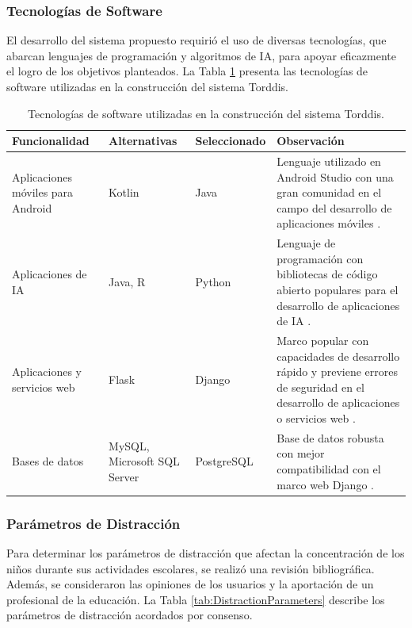 \subsubsection*{Tecnologías de Software}
El desarrollo del sistema propuesto requirió el uso de diversas tecnologías, que abarcan lenguajes de programación y algoritmos de IA, para apoyar eficazmente el logro de los objetivos planteados. La Tabla \ref{table:software-technologies} presenta las tecnologías de software utilizadas en la construcción del sistema Torddis.

\begin{table}[hbt]
\caption{Tecnologías de software utilizadas en la construcción del sistema Torddis.}
\label{table:software-technologies}
\centering
\begin{tabular}{p{}p{}p{}p{}}
	\hline
	\multicolumn{1}{l}{\textbf{Funcionalidad}} & \multicolumn{1}{l}{\textbf{Alternativas }} & \multicolumn{1}{l}{\textbf{Seleccionado}} & \multicolumn{1}{l}{\textbf{Observación}} \\ \hline
	Aplicaciones móviles para Android & Kotlin & Java & Lenguaje utilizado en Android Studio con una gran comunidad en el campo del desarrollo de aplicaciones móviles \citep{Sharma2021Real-Time}. \\
	Aplicaciones de IA & Java, R & Python & Lenguaje de programación con bibliotecas de código abierto populares para el desarrollo de aplicaciones de IA \citep{Cai2005OnThePerformance}. \\
	Aplicaciones y servicios web & Flask & Django & Marco popular con capacidades de desarrollo rápido y previene errores de seguridad en el desarrollo de aplicaciones o servicios web \citep{Puneet2022ADjango}. \\
	Bases de datos & MySQL, Microsoft SQL Server & PostgreSQL & Base de datos robusta con mejor compatibilidad con el marco web Django \citep{Puneet2022ADjango}. \\ \hline
\end{tabular}
\end{table}

\subsubsection*{Parámetros de Distracción}
Para determinar los parámetros de distracción que afectan la concentración de los niños durante sus actividades escolares, se realizó una revisión bibliográfica. Además, se consideraron las opiniones de los usuarios y la aportación de un profesional de la educación. La Tabla \ref{tab:DistractionParameters} describe los parámetros de distracción acordados por consenso.

